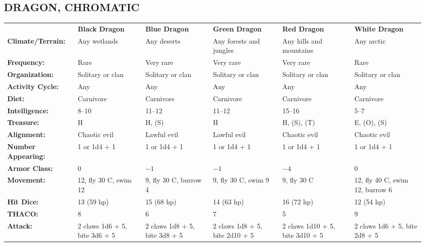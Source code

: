 \noindent \begin{minipage}{\columnwidth}

\subsection*{DRAGON, CHROMATIC}

\noindent \begin{tabular}{p{}g{.13\columnwidth}p{.13\columnwidth}g{.13\columnwidth}p{.13\columnwidth}g{.13\columnwidth}}
				& \textbf{Black Dragon}	& \textbf{Blue Dragon}	& \textbf{Green Dragon}	& \textbf{Red Dragon}	& \textbf{White Dragon}	\\
\textbf{Climate/Terrain:}	& Any wetlands		& Any deserts		& Any forests and jungles	& Any hills and mountains	& Any arctic	\\
\textbf{Frequency:} 		& Rare			& Very rare		& Very rare		& Very rare		& Rare	\\
\textbf{Organization:} 		& Solitary or clan	& Solitary or clan	& Solitary or clan	& Solitary or clan	& Solitary or clan	\\
\textbf{Activity Cycle:} 	& Any			& Any			& Any			& Any			& Any	\\
\textbf{Diet:} 			& Carnivore		& Carnivore		& Carnivore		& Carnivore		& Carnivore	\\
\textbf{Intelligence:} 		& 8--10			& 11--12		& 11--12		& 15--16		& 5--7	\\
\textbf{Treasure:} 		& H	& H, (S)	& H			& H, (S), (T)	& E, (O), (S)	\\
\textbf{Alignment:} 		& Chaotic evil		& Lawful evil		& Lawful evil		& Chaotic evil		& Chaotic evil	\\
\hline
\textbf{Number Appearing:} 	& 1 or 1d4 + 1		& 1 or 1d4 + 1		& 1 or 1d4 + 1		& 1 or 1d4 + 1		& 1 or 1d4 + 1	\\
\textbf{Armor Class:} 		& 0			& $-1$			& $-1$			& $-4$			& 0	\\
\textbf{Movement:} 		& 12, fly 30 C, swim 12	& 9, fly 30 C, burrow 4	& 9, fly 30 C, swim 9	& 9, fly 30 C		& 12, fly 40 C, swim 12, burrow 6	\\
\textbf{Hit Dice:} 		& 13 (59 hp)		& 15 (68 hp)		& 14 (63 hp)		& 16 (72 hp)		& 12 (54 hp)	\\
\textbf{THACO:} 			& 	8						& 6						& 	7						& 	5						& 	9					\\
\textbf{Attack:} 		& 2 claws 1d6 + 5, bite 3d6 + 5	& 2 claws 1d8 + 5, bite 3d8 + 5	& 2 claws 1d8 + 5, bite 2d10 + 5	& 2 claws 1d10 + 5, bite 3d10 + 5	& 2 claws 1d6 + 5, bite 2d8 + 5	\\

\end{tabular}
\end{minipage}
